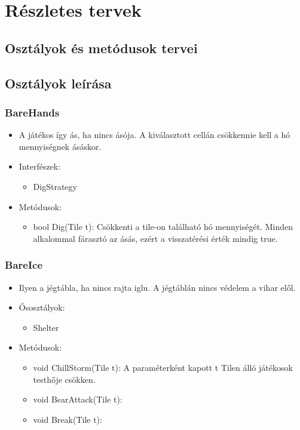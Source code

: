 %
\chapter{Részletes tervek}

\thispagestyle{fancy}

\section{Osztályok és metódusok tervei}

\lstset{
	breakatwhitespace=false,
	breaklines=true,
	tabsize=2,
	frame=L,
	numbers=left,
	basicstyle=\small\ttfamily
}

\section{Osztályok leírása}
\subsection{BareHands}
\begin{itemize}
	\item A játékos így ás, ha nincs ásója. A kiválasztott cellán csökkennie kell a hó mennyiségnek ásáskor.
	\item Interfészek:
	\begin{itemize}
		\item DigStrategy
	\end{itemize}
	\item Metódusok:
	\begin{itemize}
		\item bool Dig(Tile t): Csökkenti a tile-on található hó mennyiségét. Minden alkalommal fárasztó az ásás, ezért a visszatérési érték mindig true.
	\end{itemize}
\end{itemize}

\subsection{BareIce}
\begin{itemize}
	\item Ilyen a jégtábla, ha nincs rajta iglu. A jégtáblán nincs védelem a vihar elől.
	\item Ősosztályok:
	\begin{itemize}
		\item Shelter
	\end{itemize}
	\item Metódusok:
	\begin{itemize}
		\item void ChillStorm(Tile t): A paraméterként kapott t Tilen álló játékosok testhője csökken.
		\item void BearAttack(Tile t):
		\item void Break(Tile t):
	\end{itemize}
\end{itemize}

